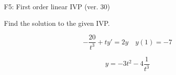 \begin{exercise}
  \begin{exerciseTitle}F5: First order linear IVP (ver. 30)\end{exerciseTitle}
  \begin{exerciseStatement}
    
Find the solution to the given IVP.

    
\[-\frac{20}{t^{3}} +ty'= 2 y \hspace{1em} y( 1 ) = -7\]

  \end{exerciseStatement}
  \begin{exerciseAnswer}
    
\[y= -3 t^ 2 -4 \frac{1}{t^{3}}\]

  \end{exerciseAnswer}
\end{exercise}